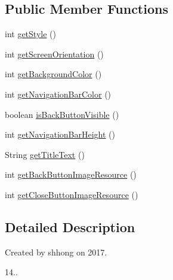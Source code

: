 \subsection*{Public Member Functions}
\begin{DoxyCompactItemize}
\item 
int \hyperlink{classcom_1_1toast_1_1android_1_1gamebase_1_1_gamebase_web_view_configuration_ab620af7635945a9f09b276050dda7492}{get\+Style} ()
\item 
int \hyperlink{classcom_1_1toast_1_1android_1_1gamebase_1_1_gamebase_web_view_configuration_ad3f0b6cf2dbdd22e77f15df451136811}{get\+Screen\+Orientation} ()
\item 
int \hyperlink{classcom_1_1toast_1_1android_1_1gamebase_1_1_gamebase_web_view_configuration_ab61d9a9b7b58dce443b6b47dcbb9cf19}{get\+Background\+Color} ()
\item 
int \hyperlink{classcom_1_1toast_1_1android_1_1gamebase_1_1_gamebase_web_view_configuration_a7732a29e0701232521b32c38031de3f6}{get\+Navigation\+Bar\+Color} ()
\item 
boolean \hyperlink{classcom_1_1toast_1_1android_1_1gamebase_1_1_gamebase_web_view_configuration_afb400af15d705c47c1c785c40c7860df}{is\+Back\+Button\+Visible} ()
\item 
int \hyperlink{classcom_1_1toast_1_1android_1_1gamebase_1_1_gamebase_web_view_configuration_ab90e54c9c780f4c6ae920be141987d0e}{get\+Navigation\+Bar\+Height} ()
\item 
String \hyperlink{classcom_1_1toast_1_1android_1_1gamebase_1_1_gamebase_web_view_configuration_a1127c3ec89551276f9cd97894e9cd40f}{get\+Title\+Text} ()
\item 
int \hyperlink{classcom_1_1toast_1_1android_1_1gamebase_1_1_gamebase_web_view_configuration_a707f3ced9dfcc025c3f90447bab9cbdb}{get\+Back\+Button\+Image\+Resource} ()
\item 
int \hyperlink{classcom_1_1toast_1_1android_1_1gamebase_1_1_gamebase_web_view_configuration_a2991e38ffc39b7ed326793daf75ef22e}{get\+Close\+Button\+Image\+Resource} ()
\end{DoxyCompactItemize}


\subsection{Detailed Description}
Created by shhong on 2017. 


\begin{DoxyEnumerate}
\item 14.. 
\end{DoxyEnumerate}

